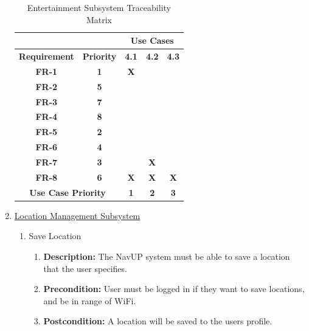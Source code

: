 \documentclass{article}
\begin{document}
\begin{enumerate}
\begin{table}[]
\centering
\caption{Entertainment Subsystem Traceability Matrix}
\label{my-label}
\begin{tabular}{|c|c|c|c|c|l|l|}
\hline
\multicolumn{2}{|c|}{}                           & \multicolumn{5}{c|}{\textbf{Use Cases}}                           \\ \hline
\textbf{Requirement}     & \textbf{Priority}     & \textbf{4.1}  & \textbf{4.2}  & \multicolumn{3}{c|}{\textbf{4.3}} \\ \hline
\textbf{FR-1}            & \textbf{1}            & \textbf{X}    & \textbf{}     & \multicolumn{3}{c|}{\textbf{}}    \\ \hline
\textbf{FR-2}            & \textbf{5}            & \textbf{}     & \textbf{}     & \multicolumn{3}{c|}{\textbf{}}    \\ \hline
\textbf{FR-3}            & \textbf{7}            & \textbf{}     & \textbf{}     & \multicolumn{3}{c|}{\textbf{}}    \\ \hline
\textbf{FR-4}            & \textbf{8}            & \textbf{}     & \textbf{}     & \multicolumn{3}{c|}{\textbf{}}    \\ \hline
\textbf{FR-5}            & \textbf{2}            & \textbf{}     & \textbf{}     & \multicolumn{3}{c|}{\textbf{}}    \\ \hline
\textbf{FR-6}            & \textbf{4}            & \textbf{}     & \textbf{}     & \multicolumn{3}{c|}{\textbf{}}    \\ \hline
\textbf{FR-7}            & \textbf{3}            & \textbf{}     & \textbf{X}    & \multicolumn{3}{c|}{\textbf{}}    \\ \hline
\textbf{FR-8}            & \textbf{6}            & \textbf{X}    & \textbf{X}    & \multicolumn{3}{c|}{\textbf{X}}   \\ \hline
\multicolumn{2}{|c|}{\textbf{Use Case Priority}} & \textbf{1}    & \textbf{2}    & \multicolumn{3}{c|}{\textbf{3}}   \\ \hline
\end{tabular}
\end{table}
	
	\item \underline{Location Management Subsystem}
\begin{enumerate}
		\item Save Location
		\begin{enumerate}
			\item \textbf{Description:} The NavUP system must be able to save a location that the user specifies. 
			\item \textbf{Precondition:} User must be logged in if they want to save locations, and be in range of WiFi.
			\item \textbf{Postcondition:} A location will be saved to the users profile.\newline
		\end{enumerate}
		

\end{enumerate}
\end{enumerate}
\end{document}
